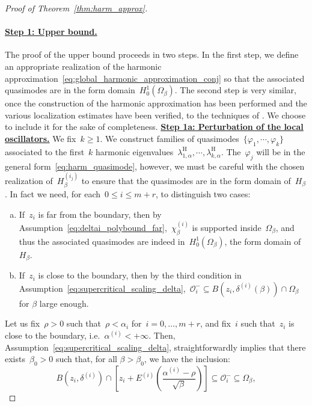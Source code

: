 \documentclass[10pt]{article}
\newcommand{\1}{\mathbbm 1}
\newcommand{\deltaRadius}[1]{\delta^{(#1)}} %
\newcommand{\epsLimit}[1]{\alpha^{(#1)}} %
\newcommand{\localNeighborhood}[2][]{\mathcal{O}_{#2}^{#1}} %
\newcommand{\halfSpace}[1]{E^{(#1)}}
\newcommand{\shift}{\rho} %
\begin{document}
\begin{proof}[Proof of Theorem~\ref{thm:harm_approx}]
        \paragraph{\underline{Step 1: Upper bound.}}
        The proof of the upper bound proceeds in two steps. In the first step, we define an appropriate realization of the harmonic approximation~\eqref{eq:global_harmonic_approximation_conj} so that the associated quasimodes are in the form domain~$H_0^1(\Omega_\beta)$. The second step is very similar, once the construction of the harmonic approximation has been performed and the various localization estimates have been verified, to the techniques of \cite{S83,CFKS87}. We choose to include it for the sake of completeness.  
        {\underline{\bf Step 1a: Perturbation of the local oscillators.}\newline}
        We fix~$k\geq 1$. We construct families of quasimodes~$\{\varphi_1,\dotsm,\varphi_k\}$ associated to the first~$k$ harmonic eigenvalues~$\lambda_{1,\alpha}^{\mathrm H},\dotsm,\lambda_{k,\alpha}^{\mathrm H}$.
        The~$\varphi_{j}$ will be in the general form~\eqref{eq:harm_quasimode}, however, we must be careful with the chosen realization of~$H_\beta^{(i_j)}$ to ensure that the quasimodes are in the form domain of~$H_\beta$.
        In fact we need, for each~$0\leq i\leq m+r$, to distinguish two cases:
        \begin{enumerate}[a)]
            \item{If~$z_i$ is far from the boundary, then by Assumption~\eqref{eq:deltai_polybound_far},~$\chi_\beta^{(i)}$ is supported inside~$\Omega_\beta$, and thus the associated quasimodes are indeed in~$H_0^1(\Omega_\beta)$, the form domain of~$H_\beta$.}
            \item{If~$z_i$ is close to the boundary, then by the third condition in Assumption~\eqref{eq:supercritical_scaling_delta},~$\localNeighborhood[-]{i}\subseteq B(z_i,\deltaRadius{i}(\beta)) \cap \Omega_\beta$ for $\beta$ large enough.}
        \end{enumerate}
        Let us fix~$\shift>0$ such that~$\shift<\alpha_i$ for~$i=0,\dots,m+r$, and fix~$i$ such that~$z_i$ is close to the boundary, i.e.~$\epsLimit{i}<+\infty$. Then, Assumption~\eqref{eq:supercritical_scaling_delta}, straightforwardly implies that there exists~$\beta_0>0$ such that, for all $\beta>\beta_0$, we have the inclusion:
        \[B(z_i,\deltaRadius{i})\cap \left[z_i + \halfSpace{i}\left(\frac{\epsLimit{i}-\shift}{\sqrt\beta}\right)\right]\subseteq \localNeighborhood[-]{i} \subseteq \Omega_\beta,\]

\end{proof}
\end{document}
